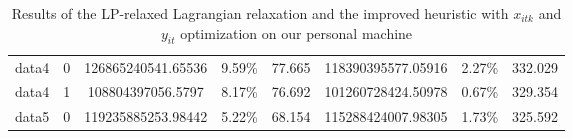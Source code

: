\begin{table}[h!tbp]
\begin{tabular}{|c|c||c|c|c||c|c|c|}
        \hline
        data4                                     & 0                                                                         & 126865240541.65536                                              & 9.59\%       & 77.665              & 118390395577.05916 & 2.27\%       & 332.029             \\
        data4                                     & 1                                                                         & 108804397056.5797                                               & 8.17\%       & 76.692              & 101260728424.50978 & 0.67\%       & 329.354             \\
        \hline
        data5                                     & 0                                                                         & 119235885253.98442                                              & 5.22\%       & 68.154              & 115288424007.98305 & 1.73\%       & 325.592             \\
        \hline
    \end{tabular}
    \caption{Results of the LP-relaxed Lagrangian relaxation and the improved heuristic with $x_{itk}$ and $y_{it}$ optimization on our personal machine}
    \label{tab:optxety_lp-relax_rl}
\end{table}
